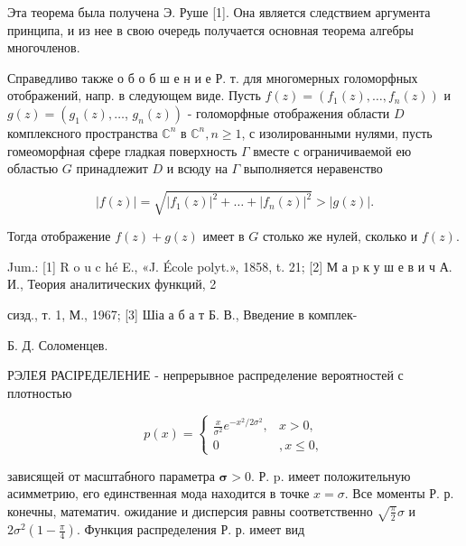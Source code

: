 \documentclass[10pt]{article}
\begin{document}
Эта теорема была получена Э. Руше [1]. Она является следствием аргумента принципа, и из нее в свою очередь получается основная теорема алгебры многочленов.



Справедливо также о б о б ш е н и е Р. т. для многомерных голоморфных отображений, напр. в следующем виде. Пусть $f(z)=\left(f_{1}(z), \ldots, f_{n}(z)\right)$ и $g(z)=\left(g_{1}(z), \ldots\right.$, $\left.g_{n}(z)\right)$ - голоморфные отображения области $D$ комплексного пространства $\mathbb{C}^{n}$ в $\mathbb{C}^{n}, n \geqslant 1$, с изолированными нулями, пусть гомеоморфная сфере гладкая поверхность $\Gamma$ вместе с ограничиваемой ею областью $G$ принадлежит $D$ и всюду на $\Gamma$ выполняется неравенство



\[

|f(z)|=\sqrt{\left|f_{1}(z)\right|^{2}+\ldots+\left|f_{n}(z)\right|^{2}}>|g(z)| .

\]



Тогда отображение $f(z)+g(z)$ имеет в $G$ столько же нулей, сколько и $f(z)$.



Jum.: [1] R o u c hé E., «J. École polyt.», 1858, t. 21; [2] М а p к у ш е в и ч А. И., Теория аналитических функций, 2

сизд., т. 1, М., 1967; [3] Шіа а б а т Б. В., Введение в комплек-

Б. Д. Соломенцев.



РЭЛЕЯ РАСІРЕДЕЛЕНИЕ - непрерывное распределение вероятностей с плотностью



\[

p(x)= \begin{cases}\frac{x}{\sigma^{2}} e^{-x^{2} / 2 \sigma^{2}}, & x>0, \\ 0 & , x \leqslant 0,\end{cases}

\]



зависящей от масштабного параметра $\boldsymbol{\sigma}>0$. Р. p. имеет положительную асимметрию, его единственная мода находится в точке $x=\sigma$. Все моменты Р. р. конечны, математич. ожидание и дисперсия равны соответственно $\sqrt{\frac{\pi}{2}} \sigma$ и $2 \sigma^{2}\left(1-\frac{\pi}{4}\right)$. Функция распределения Р. р. имеет вид
\end{document}
